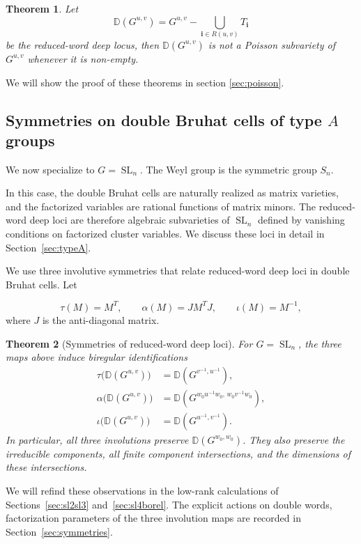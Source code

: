 \documentclass[12pt]{amsart}
\newcommand{\D}{\mathbb D}
\newcommand{\SL}{\operatorname{SL}}
\theoremstyle{plain}
\newtheorem{theorem}{Theorem}[section]
\theoremstyle{definition}
\theoremstyle{remark}
\begin{document}
\begin{theorem}
Let
\[
\mathbb D(G^{u,v})=G^{u,v}-\bigcup_{\mathbf i\in R(u,v)}T_{\mathbf i}
\]
be the reduced-word deep locus, then $\mathbb D(G^{u,v})$ is not a Poisson subvariety of
$G^{u,v}$ whenever it is non-empty.
\end{theorem}

We will show the proof of these theorems in section \ref{sec:poisson}.  

\subsection{Symmetries on double Bruhat cells of type \texorpdfstring{$A$}{A} groups}

We now specialize to $G=\SL_n$. The Weyl group is the symmetric group $S_n$.  

In this case, the double Bruhat cells are naturally realized as matrix varieties, and the factorized variables are rational functions of matrix minors.  The reduced-word deep loci are therefore algebraic subvarieties of $\SL_n$ defined by vanishing conditions on factorized cluster variables. We discuss these loci in detail in Section~\ref{sec:typeA}.  

We use three involutive symmetries that relate reduced-word deep loci in double Bruhat cells.  Let

\[
\tau(M)=M^T,\qquad
\alpha(M)=JM^TJ,\qquad
\iota(M)=M^{-1},
\]
where $J$ is the anti-diagonal matrix.

\begin{theorem}[Symmetries of reduced-word deep loci]
\label{thm:intro_symmetries}
For $G=\SL_n$, the three maps above induce biregular identifications
\[
\begin{aligned}
\tau\bigl(\D(G^{u,v})\bigr)
   &=\D(G^{v^{-1},u^{-1}}),\\
\alpha\bigl(\D(G^{u,v})\bigr)
   &=\D(G^{w_0u^{-1}w_0,\,w_0v^{-1}w_0}),\\
\iota\bigl(\D(G^{u,v})\bigr)
   &=\D(G^{u^{-1},v^{-1}}).
\end{aligned}
\]
In particular, all three involutions preserve $\D(G^{w_0,w_0})$.  They also preserve the irreducible components, all finite component intersections, and the dimensions of these intersections.
\end{theorem}

We will refind these observations in the low-rank calculations of Sections~\ref{sec:sl2sl3} and~\ref{sec:sl4borel}.  The explicit actions on double words, factorization parameters of the three involution maps are recorded in Section~\ref{sec:symmetries}.
\end{document}
